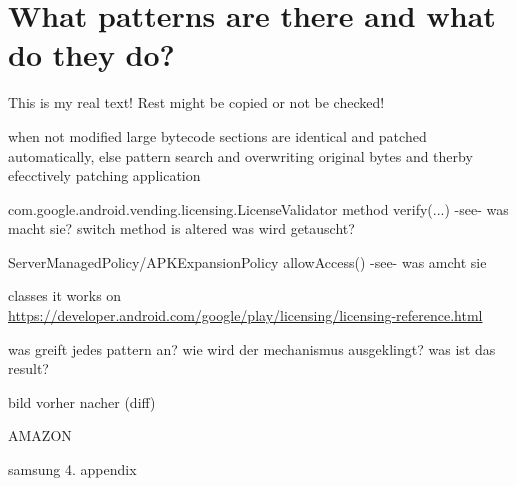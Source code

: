 \section{What patterns are there and what do they do?} \label{section:luckypatcher-patterns}
This is my real text! Rest might be copied or not be checked!

%
when  not modified large bytecode sections are identical and patched automatically, else pattern search and overwriting original bytes and therby efecctively patching application



com.google.android.vending.licensing.LicenseValidator
method verify(...) -see- was macht sie?
switch method is altered
was wird getauscht?


ServerManagedPolicy/APKExpansionPolicy
allowAccess() -see- was amcht sie



\cite{munteanLicense}
%

classes it works on
\url{https://developer.android.com/google/play/licensing/licensing-reference.html}

was greift jedes pattern an? wie wird der mechanismus ausgeklingt? was ist das result?

bild vorher nacher (diff)


AMAZON

samsung
\cite{samsungZirconia} 4. appendix
